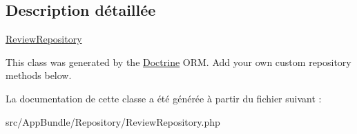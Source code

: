 \subsection{Description détaillée}
\hyperlink{classAppBundle_1_1Repository_1_1ReviewRepository}{Review\+Repository}

This class was generated by the \hyperlink{namespaceAppBundle_1_1Doctrine}{Doctrine} O\+RM. Add your own custom repository methods below. 

La documentation de cette classe a été générée à partir du fichier suivant \+:\begin{DoxyCompactItemize}
\item 
src/\+App\+Bundle/\+Repository/Review\+Repository.\+php\end{DoxyCompactItemize}
